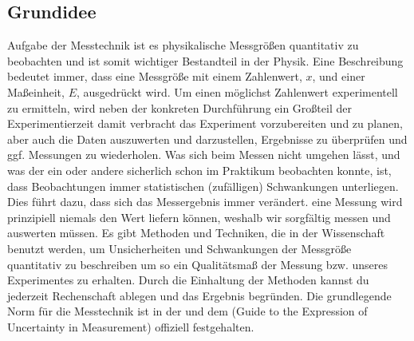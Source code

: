 \documentclass[letterpaper,10pt,english]{jupyterBook}
\begin{document}
\subsection{Grundidee}
\label{\detokenize{content/1_Einleitung:grundidee}}
\sphinxAtStartPar
Aufgabe der Messtechnik ist es physikalische Messgrößen quantitativ zu beobachten und ist somit wichtiger Bestandteil in der Physik. Eine  Beschreibung bedeutet immer, dass eine Messgröße mit einem Zahlenwert, \(x\), und einer Maßeinheit, \(E\), ausgedrückt wird. Um einen möglichst  Zahlenwert experimentell zu ermitteln, wird neben der konkreten Durchführung ein Großteil der Experimentierzeit damit verbracht das Experiment vorzubereiten und zu planen, aber auch die Daten auszuwerten und darzustellen, Ergebnisse zu überprüfen und ggf. Messungen zu wiederholen.
Was sich beim Messen nicht umgehen lässt, und was der ein oder andere sicherlich schon im Praktikum beobachten konnte, ist, dass Beobachtungen immer statistischen (zufälligen) Schwankungen unterliegen. Dies führt dazu, dass sich das Messergebnis immer verändert. eine Messung wird prinzipiell niemals den  Wert liefern können, weshalb wir sorgfältig messen und auswerten müssen. Es gibt  Methoden und Techniken, die in der Wissenschaft benutzt werden, um Unsicherheiten und Schwankungen der Messgröße quantitativ zu beschreiben um so ein Qualitätsmaß der Messung bzw. unseres Experimentes zu erhalten. Durch die Einhaltung der  Methoden kannst du jederzeit Rechenschaft ablegen und das Ergebnis begründen. Die grundlegende Norm für die Messtechnik ist in der  und dem  (Guide to the Expression of Uncertainty in Measurement) offiziell festgehalten.
\end{document}
